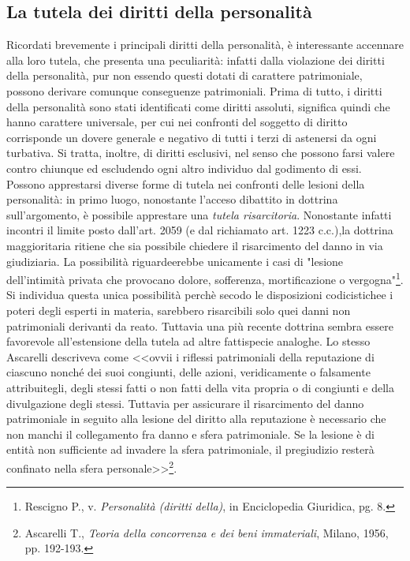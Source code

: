 \subsection{La tutela dei diritti della personalità}

Ricordati brevemente i principali diritti della personalità, è interessante accennare alla loro tutela, che presenta una peculiarità: infatti dalla violazione dei diritti della personalità, pur non essendo questi dotati di carattere patrimoniale, possono derivare comunque conseguenze patrimoniali.
Prima di tutto, i diritti della personalità sono stati identificati come  diritti assoluti, significa quindi che hanno carattere universale, per cui nei confronti del soggetto di diritto corrisponde un dovere generale e negativo di tutti i terzi di astenersi da ogni turbativa. Si tratta, inoltre, di diritti esclusivi, nel senso che possono farsi valere contro chiunque ed escludendo ogni altro individuo dal godimento di essi. 
\\Possono apprestarsi diverse forme di tutela nei confronti delle lesioni della personalità: in primo luogo, nonostante l'acceso dibattito in dottrina sull'argomento, è possibile apprestare una \textit{tutela risarcitoria}. Nonostante infatti incontri il limite posto dall'art. 2059 (e dal richiamato art. 1223 c.c.),la dottrina maggioritaria ritiene che sia possibile chiedere il risarcimento del danno in via giudiziaria. La possibilità riguardeerebbe unicamente i casi di "lesione dell'intimità privata che provocano dolore, sofferenza, mortificazione o vergogna"\footnote{Rescigno P., v. \textit{Personalità (diritti della)}, in Enciclopedia Giuridica, pg. 8.}.
Si individua questa unica possibilità perchè secodo le disposizioni codicistichee i poteri degli esperti in materia, sarebbero risarcibili solo quei danni non patrimoniali derivanti da reato. Tuttavia una più recente dottrina sembra essere favorevole all'estensione della tutela ad altre fattispecie analoghe. Lo stesso Ascarelli descriveva come <<ovvii i riflessi patrimoniali della reputazione di ciascuno nonché dei suoi congiunti, delle azioni, veridicamente o falsamente attribuitegli, degli stessi fatti o non fatti della vita propria o di congiunti e della divulgazione degli stessi. Tuttavia per assicurare il risarcimento del danno patrimoniale in seguito alla lesione del diritto alla reputazione è necessario che non manchi il collegamento fra danno e sfera patrimoniale. Se la lesione è di entità non sufficiente ad invadere la sfera patrimoniale, il pregiudizio resterà confinato nella sfera personale>>\footnote{Ascarelli T., \textit{Teoria della concorrenza e dei beni immateriali}, Milano, 1956, pp. 192-193.}.
